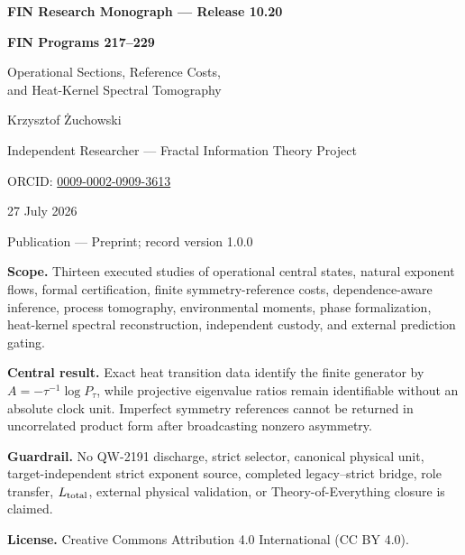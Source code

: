 \documentclass[11pt,a4paper,openany]{report}
\begin{document}
\hypersetup{pageanchor=false}
\begin{titlepage}
\centering
\vspace*{8mm}
{\Large\bfseries FIN Research Monograph --- Release 10.20\par}
\vspace{10mm}
{\Huge\bfseries FIN Programs 217--229\par}
\vspace{6mm}
{\Large Operational Sections, Reference Costs,\\
and Heat-Kernel Spectral Tomography\par}
\vspace{16mm}
{\Large Krzysztof \.Zuchowski\par}
\vspace{2mm}
{\normalsize Independent Researcher --- Fractal Information Theory Project\par}
\vspace{2mm}
{\normalsize ORCID: \href{https://orcid.org/0009-0002-0909-3613}{0009-0002-0909-3613}\par}
\vspace{10mm}
{\large 27 July 2026\par}
{\normalsize Publication --- Preprint; record version 1.0.0\par}
\vfill
\begin{minipage}{0.88\textwidth}
\small
\textbf{Scope.} Thirteen executed studies of operational central states,
natural exponent flows, formal certification, finite symmetry-reference
costs, dependence-aware inference, process tomography, environmental moments,
phase formalization, heat-kernel spectral reconstruction, independent
custody, and external prediction gating.

\medskip
\textbf{Central result.} Exact heat transition data identify the finite
generator by \(A=-\tau^{-1}\log P_\tau\), while projective eigenvalue ratios
remain identifiable without an absolute clock unit. Imperfect symmetry
references cannot be returned in uncorrelated product form after broadcasting
nonzero asymmetry.

\medskip
\textbf{Guardrail.} No QW-2191 discharge, strict selector, canonical physical
unit, target-independent strict exponent source, completed legacy--strict
bridge, role transfer, \(L_{\rm total}\), external physical validation, or
Theory-of-Everything closure is claimed.

\medskip
\textbf{License.} Creative Commons Attribution 4.0 International (CC BY 4.0).
\end{minipage}
\vfill
\end{titlepage}
\hypersetup{pageanchor=true}
\end{document}

